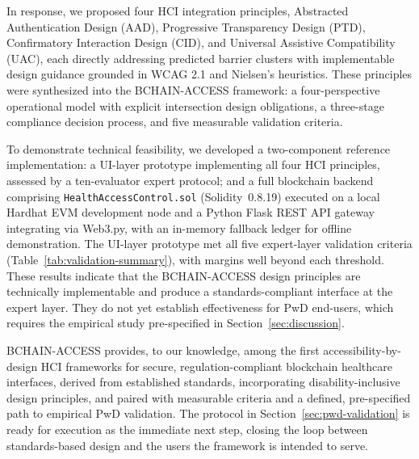 \documentclass[journal,onecolumn]{IEEEtran}
\begin{document}
In response, we proposed four HCI integration principles, Abstracted Authentication Design (AAD), Progressive Transparency Design (PTD), Confirmatory Interaction Design (CID), and Universal Assistive Compatibility (UAC), each directly addressing predicted barrier clusters with implementable design guidance grounded in WCAG 2.1 and Nielsen's heuristics. These principles were synthesized into the BCHAIN-ACCESS framework: a four-perspective operational model with explicit intersection design obligations, a three-stage compliance decision process, and five measurable validation criteria.

To demonstrate technical feasibility, we developed a two-component reference implementation: a UI-layer prototype implementing all four HCI principles, assessed by a ten-evaluator expert protocol; and a full blockchain backend comprising \texttt{HealthAccessControl.sol} (Solidity~0.8.19) executed on a local Hardhat EVM development node and a Python Flask REST API gateway integrating via Web3.py, with an in-memory fallback ledger for offline demonstration. The UI-layer prototype met all five expert-layer validation criteria (Table~\ref{tab:validation-summary}), with margins well beyond each threshold. These results indicate that the BCHAIN-ACCESS design principles are technically implementable and produce a standards-compliant interface at the expert layer. They do not yet establish effectiveness for PwD end-users, which requires the empirical study pre-specified in Section~\ref{sec:discussion}.

BCHAIN-ACCESS provides, to our knowledge, among the first accessibility-by-design HCI frameworks for secure, regulation-compliant blockchain healthcare interfaces, derived from established standards, incorporating disability-inclusive design principles, and paired with measurable criteria and a defined, pre-specified path to empirical PwD validation. The protocol in Section~\ref{sec:pwd-validation} is ready for execution as the immediate next step, closing the loop between standards-based design and the users the framework is intended to serve.



\end{document}
